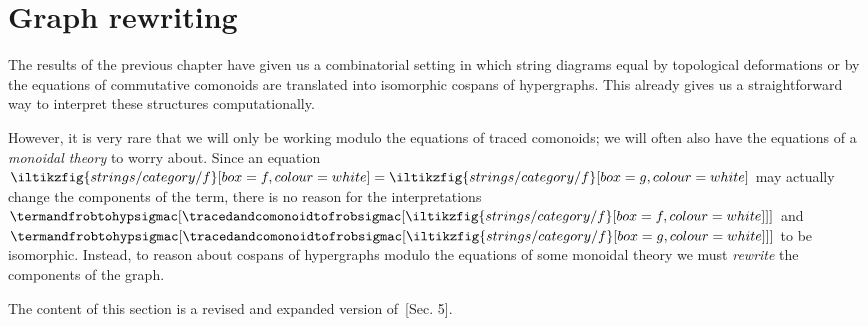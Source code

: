 \chapter{Graph rewriting}

The results of the previous chapter have given us a combinatorial setting in
which string diagrams equal by topological deformations or by the equations of
commutative comonoids are translated into isomorphic cospans of hypergraphs.
This already gives us a straightforward way to interpret these structures
computationally.

However, it is very rare that we will only be working modulo the equations of
traced comonoids; we will often also have the equations of a
\emph{monoidal theory} to worry about.
Since an equation \(
    \iltikzfig{strings/category/f}[box=f,colour=white]
    =
    \iltikzfig{strings/category/f}[box=g,colour=white]
\) may actually change the components of the term, there is no reason for the
interpretations \(
    \termandfrobtohypsigmac[
        \tracedandcomonoidtofrobsigmac[
            \iltikzfig{strings/category/f}[box=f,colour=white]
        ]
    ]
\) and \(
    \termandfrobtohypsigmac[
        \tracedandcomonoidtofrobsigmac[
            \iltikzfig{strings/category/f}[box=g,colour=white]
        ]
    ]
\) to be isomorphic.
Instead, to reason about cospans of hypergraphs modulo the equations of some
monoidal theory we must \emph{rewrite} the components of the graph.

\begin{remark}
    The content of this section is a revised and expanded version
    of~\cite{ghica2023rewriting}[Sec. 5].
\end{remark}



